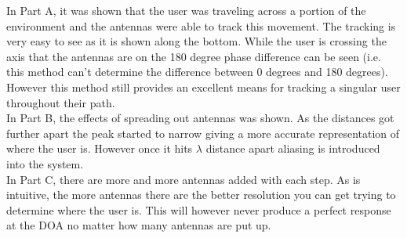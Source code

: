 \documentclass{article}
\begin{document}
In Part A, it was shown that the user was traveling across a portion of the environment and the antennas were able to track this movement. The tracking is very easy to see as it is shown along the bottom. While the user is crossing the axis that the antennas are on the 180 degree phase difference can be seen (i.e. this method can't determine the difference between 0 degrees and 180 degrees). However this method still provides an excellent means for tracking a singular user throughout their path.\\

In Part B, the effects of spreading out antennas was shown. As the distances got further apart the peak started to narrow giving a more accurate representation of where the user is. However once it hits \( \lambda \) distance apart aliasing is introduced into the system. \\

In Part C, there are more and more antennas added with each step. As is intuitive, the more antennas there are the better resolution you can get trying to determine where the user is. This will however never produce a perfect response at the DOA no matter how many antennas are put up.
\end{document}
